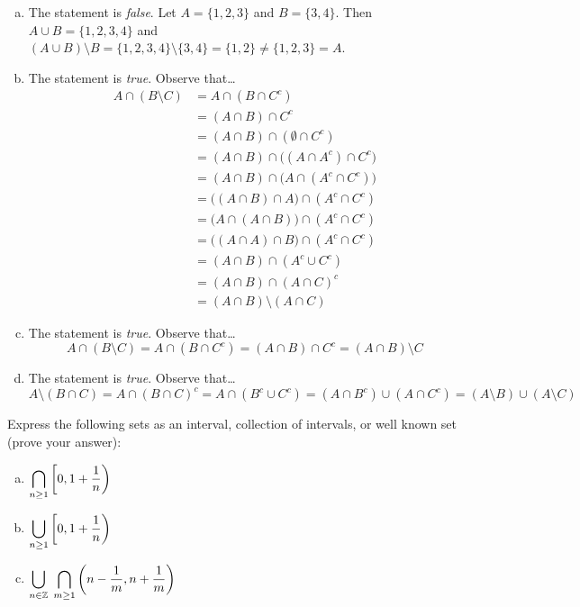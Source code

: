 \documentclass[11pt,letterpaper]{article}
\begin{document}
\sol
\begin{enumerate}[(a)]
\item The statement is \textit{false}. Let $A= \{ 1, 2, 3 \}$ and $B= \{ 3, 4 \}$. Then $A \cup B= \{ 1, 2, 3, 4 \}$ and $(A \cup B) \setminus B= \{ 1, 2, 3, 4 \} \setminus \{ 3, 4 \}= \{ 1, 2 \} \neq \{ 1, 2, 3 \}= A$. 

\item The statement is \textit{true}. Observe that\dots
	\[
	\begin{aligned}
	A \cap (B \setminus C)&= A \cap (B \cap C^c) \\
	&= (A \cap B) \cap C^c \\
	&= (A \cap B) \cap ( \emptyset \cap C^c) \\
	&= (A \cap B) \cap \big( (A \cap A^c) \cap C^c \big) \\
	&= (A \cap B) \cap \big( A \cap (A^c \cap C^c) \big) \\
	&= \big( (A \cap B) \cap A \big) \cap (A^c \cap C^c) \\
	&= \big( A \cap (A \cap B) \big) \cap (A^c \cap C^c) \\
	&= \big( (A \cap A) \cap B \big) \cap (A^c \cap C^c) \\
	&= (A \cap B) \cap (A^c \cup C^c)\\
	&= (A \cap B) \cap (A \cap C)^c \\
	&= (A \cap B) \setminus (A \cap C)
	\end{aligned}
	\]

\item The statement is \textit{true}. Observe that\dots
	\[
	A \cap (B \setminus C)= A \cap (B \cap C^c)= (A \cap B) \cap C^c= (A \cap B) \setminus C
	\]

\item The statement is \textit{true}. Observe that\dots
	\[
	A \setminus (B \cap C)= A \cap (B \cap C)^c= A \cap (B^c \cup C^c)= (A \cap B^c) \cup (A \cap C^c)= (A \setminus B) \cup (A \setminus C)
	\]
\end{enumerate}





\newpage





 Express the following sets as an interval, collection of intervals, or well known set (prove your answer): 
	\begin{enumerate}[(a)]
	\item $\displaystyle\bigcap_{n \geq 1} \left[0, 1 + \frac{1}{n} \right)$
	\item $\displaystyle\bigcup_{n \geq 1} \left[0, 1 + \frac{1}{n} \right)$
	\item $\displaystyle\bigcup_{n \in \mathbb{Z}}\; \bigcap_{m \geq 1} \left( n - \frac{1}{m}, n + \frac{1}{m} \right)$
	\end{enumerate} \pspace
\end{document}
